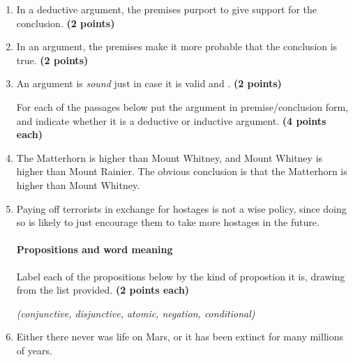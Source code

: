 \documentclass[10pt]{article}
\begin{document}
\begin{enumerate}
  \item In a deductive argument, the premises purport to give \underline{\hspace{2in}} support for the conclusion. \textbf{(2 points)}
  
  \item In an \underline{\hspace{2in}} argument, the premises make it more probable that the conclusion is true. \textbf{(2 points)}
  
  \item An argument is \textit{sound} just in case it is valid and \underline{\hspace{4in}}. \textbf{(2 points)}
  

\vspace{0.5cm}

For each of the passages below put the argument in premise/conclusion form, and indicate whether it is a deductive or inductive argument. \textbf{(4 points each)}


  \item The Matterhorn is higher than Mount Whitney, and Mount Whitney is higher than Mount Rainier. The obvious conclusion is that the Matterhorn is higher than Mount Whitney.
  
  \vspace{2.5cm}
  
  \item Paying off terrorists in exchange for hostages is not a wise policy, since doing so is likely to just encourage them to take more hostages in the future.
  
  \vspace{2.5cm}


\paragraph{Propositions and word meaning}

Label each of the propositions below by the kind of propostion it is, drawing from the list provided. \textbf{(2 points each)}

\begin{center}\textit{(conjunctive, disjunctive, atomic, negation, conditional)}\end{center}

  \item Either there never was life on Mars, or it has been extinct for many millions of years. \underline{\hspace{2in}}
  

\end{enumerate}
\end{document}
